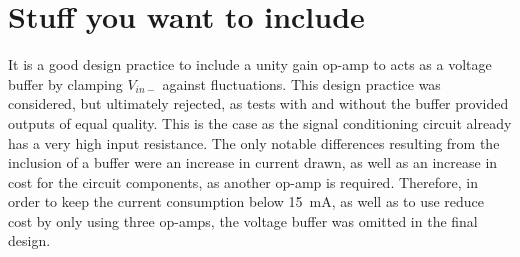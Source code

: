      \chapter{Stuff you want to include}

It is a good design practice to include a unity gain op-amp to acts as a voltage buffer by clamping $V_{in-}$ against fluctuations. This design practice was considered, but ultimately rejected, as tests with and without the buffer provided outputs of equal quality. This is the case as the signal conditioning circuit already has a very high input resistance. The only notable differences resulting from the inclusion of a buffer were an increase in current drawn, as well as an increase in cost for the circuit components, as another op-amp is required. Therefore, in order to keep the current consumption below \SI{15}{mA}, as well as to use reduce cost by only using three op-amps, the voltage buffer was omitted in the final design.\\